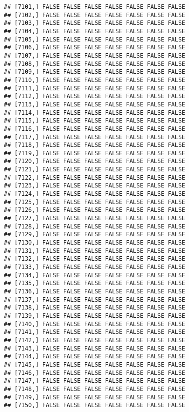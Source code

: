 \documentclass[
]{article}
\begin{document}
\begin{verbatim}
## [7101,] FALSE FALSE FALSE FALSE FALSE FALSE FALSE
## [7102,] FALSE FALSE FALSE FALSE FALSE FALSE FALSE
## [7103,] FALSE FALSE FALSE FALSE FALSE FALSE FALSE
## [7104,] FALSE FALSE FALSE FALSE FALSE FALSE FALSE
## [7105,] FALSE FALSE FALSE FALSE FALSE FALSE FALSE
## [7106,] FALSE FALSE FALSE FALSE FALSE FALSE FALSE
## [7107,] FALSE FALSE FALSE FALSE FALSE FALSE FALSE
## [7108,] FALSE FALSE FALSE FALSE FALSE FALSE FALSE
## [7109,] FALSE FALSE FALSE FALSE FALSE FALSE FALSE
## [7110,] FALSE FALSE FALSE FALSE FALSE FALSE FALSE
## [7111,] FALSE FALSE FALSE FALSE FALSE FALSE FALSE
## [7112,] FALSE FALSE FALSE FALSE FALSE FALSE FALSE
## [7113,] FALSE FALSE FALSE FALSE FALSE FALSE FALSE
## [7114,] FALSE FALSE FALSE FALSE FALSE FALSE FALSE
## [7115,] FALSE FALSE FALSE FALSE FALSE FALSE FALSE
## [7116,] FALSE FALSE FALSE FALSE FALSE FALSE FALSE
## [7117,] FALSE FALSE FALSE FALSE FALSE FALSE FALSE
## [7118,] FALSE FALSE FALSE FALSE FALSE FALSE FALSE
## [7119,] FALSE FALSE FALSE FALSE FALSE FALSE FALSE
## [7120,] FALSE FALSE FALSE FALSE FALSE FALSE FALSE
## [7121,] FALSE FALSE FALSE FALSE FALSE FALSE FALSE
## [7122,] FALSE FALSE FALSE FALSE FALSE FALSE FALSE
## [7123,] FALSE FALSE FALSE FALSE FALSE FALSE FALSE
## [7124,] FALSE FALSE FALSE FALSE FALSE FALSE FALSE
## [7125,] FALSE FALSE FALSE FALSE FALSE FALSE FALSE
## [7126,] FALSE FALSE FALSE FALSE FALSE FALSE FALSE
## [7127,] FALSE FALSE FALSE FALSE FALSE FALSE FALSE
## [7128,] FALSE FALSE FALSE FALSE FALSE FALSE FALSE
## [7129,] FALSE FALSE FALSE FALSE FALSE FALSE FALSE
## [7130,] FALSE FALSE FALSE FALSE FALSE FALSE FALSE
## [7131,] FALSE FALSE FALSE FALSE FALSE FALSE FALSE
## [7132,] FALSE FALSE FALSE FALSE FALSE FALSE FALSE
## [7133,] FALSE FALSE FALSE FALSE FALSE FALSE FALSE
## [7134,] FALSE FALSE FALSE FALSE FALSE FALSE FALSE
## [7135,] FALSE FALSE FALSE FALSE FALSE FALSE FALSE
## [7136,] FALSE FALSE FALSE FALSE FALSE FALSE FALSE
## [7137,] FALSE FALSE FALSE FALSE FALSE FALSE FALSE
## [7138,] FALSE FALSE FALSE FALSE FALSE FALSE FALSE
## [7139,] FALSE FALSE FALSE FALSE FALSE FALSE FALSE
## [7140,] FALSE FALSE FALSE FALSE FALSE FALSE FALSE
## [7141,] FALSE FALSE FALSE FALSE FALSE FALSE FALSE
## [7142,] FALSE FALSE FALSE FALSE FALSE FALSE FALSE
## [7143,] FALSE FALSE FALSE FALSE FALSE FALSE FALSE
## [7144,] FALSE FALSE FALSE FALSE FALSE FALSE FALSE
## [7145,] FALSE FALSE FALSE FALSE FALSE FALSE FALSE
## [7146,] FALSE FALSE FALSE FALSE FALSE FALSE FALSE
## [7147,] FALSE FALSE FALSE FALSE FALSE FALSE FALSE
## [7148,] FALSE FALSE FALSE FALSE FALSE FALSE FALSE
## [7149,] FALSE FALSE FALSE FALSE FALSE FALSE FALSE
## [7150,] FALSE FALSE FALSE FALSE FALSE FALSE FALSE

\end{verbatim}
\end{document}
